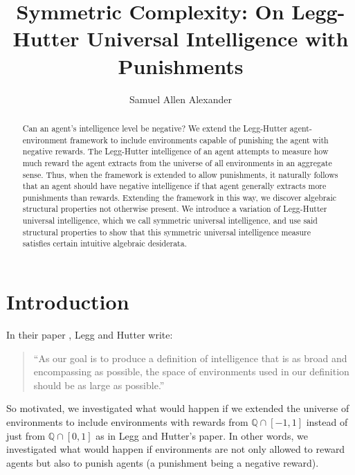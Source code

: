 \documentclass{article}
\title{Symmetric Complexity: On Legg-Hutter Universal Intelligence with Punishments}
\author{Samuel Allen Alexander}
\begin{document}
\maketitle

\begin{abstract}
    Can an agent's intelligence level be negative?
    We extend the Legg-Hutter agent-environment framework to include environments
    capable of punishing the agent with negative rewards. The Legg-Hutter
    intelligence of an agent attempts to measure how much reward the agent
    extracts from the universe of all environments in an aggregate sense. Thus,
    when the framework is extended to allow punishments, it naturally follows
    that an agent should have negative intelligence if that agent generally
    extracts more punishments than rewards.
    Extending the framework in this way, we discover algebraic structural properties
    not otherwise present. We introduce a variation of Legg-Hutter universal
    intelligence, which we call symmetric universal intelligence, and use said
    structural properties to show that this symmetric universal intelligence
    measure satisfies certain intuitive algebraic desiderata.
\end{abstract}

\section{Introduction}

In their paper \cite{legg2007universal}, Legg and Hutter write:
\begin{quote}
    ``As our goal is to produce a definition of intelligence that is as broad and
    encompassing as possible, the space of environments used in our definition should
    be as large as possible.''
\end{quote}
So motivated, we investigated what would happen if we extended the universe
of environments to include environments with rewards from $\mathbb Q\cap [-1,1]$
instead of just from $\mathbb Q\cap [0,1]$ as in Legg and Hutter's paper.
In other words, we investigated what would happen if environments are not only
allowed to reward agents but also to punish agents (a punishment being a negative
reward).
\end{document}

